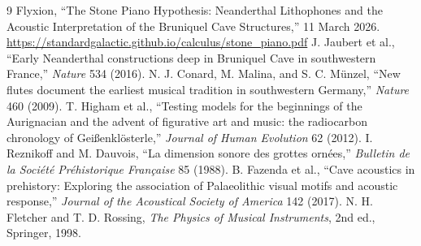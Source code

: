 \documentclass[12pt]{article}
\begin{document}
\begin{thebibliography}{9}
 Flyxion, ``The Stone Piano Hypothesis: Neanderthal Lithophones and the Acoustic Interpretation of the Bruniquel Cave Structures,'' 11 March 2026. \url{https://standardgalactic.github.io/calculus/stone_piano.pdf}
 J. Jaubert et al., ``Early Neanderthal constructions deep in Bruniquel Cave in southwestern France,'' \emph{Nature} 534 (2016).
 N. J. Conard, M. Malina, and S. C. M\"unzel, ``New flutes document the earliest musical tradition in southwestern Germany,'' \emph{Nature} 460 (2009).
 T. Higham et al., ``Testing models for the beginnings of the Aurignacian and the advent of figurative art and music: the radiocarbon chronology of Gei\ss enkl\"osterle,'' \emph{Journal of Human Evolution} 62 (2012).
 I. Reznikoff and M. Dauvois, ``La dimension sonore des grottes orn\'ees,'' \emph{Bulletin de la Soci\'et\'e Pr\'ehistorique Fran\c{c}aise} 85 (1988).
 B. Fazenda et al., ``Cave acoustics in prehistory: Exploring the association of Palaeolithic visual motifs and acoustic response,'' \emph{Journal of the Acoustical Society of America} 142 (2017).
 N. H. Fletcher and T. D. Rossing, \emph{The Physics of Musical Instruments}, 2nd ed., Springer, 1998.
\end{thebibliography}
\end{document}
